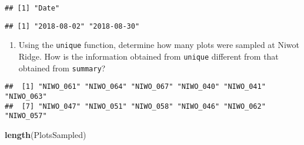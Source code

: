 \documentclass[
]{article}
\newenvironment{Shaded}{\begin{snugshade}}{\end{snugshade}}
\newcommand{\DataTypeTok}[1]{\textcolor[rgb]{0.13,0.29,0.53}{#1}}
\newcommand{\KeywordTok}[1]{\textcolor[rgb]{0.13,0.29,0.53}{\textbf{#1}}}
\newcommand{\NormalTok}[1]{#1}
\newcommand{\OperatorTok}[1]{\textcolor[rgb]{0.81,0.36,0.00}{\textbf{#1}}}
\newcommand{\StringTok}[1]{\textcolor[rgb]{0.31,0.60,0.02}{#1}}
\providecommand{\tightlist}{%
  \setlength{\itemsep}{0pt}\setlength{\parskip}{0pt}}
\begin{document}
\begin{Shaded}
\end{Shaded}

\begin{verbatim}
## [1] "Date"
\end{verbatim}

\begin{Shaded}
\end{Shaded}

\begin{verbatim}
## [1] "2018-08-02" "2018-08-30"
\end{verbatim}

\begin{enumerate}
\def\labelenumi{\arabic{enumi}.}
\setcounter{enumi}{12}
\tightlist
\item
  Using the \texttt{unique} function, determine how many plots were
  sampled at Niwot Ridge. How is the information obtained from
  \texttt{unique} different from that obtained from \texttt{summary}?
\end{enumerate}

\begin{Shaded}
\end{Shaded}

\begin{verbatim}
##  [1] "NIWO_061" "NIWO_064" "NIWO_067" "NIWO_040" "NIWO_041" "NIWO_063"
##  [7] "NIWO_047" "NIWO_051" "NIWO_058" "NIWO_046" "NIWO_062" "NIWO_057"
\end{verbatim}

\begin{Shaded}
\begin{Highlighting}[]
\KeywordTok{length}\NormalTok{(PlotsSampled)}
\end{Highlighting}
\end{Shaded}
\end{document}

